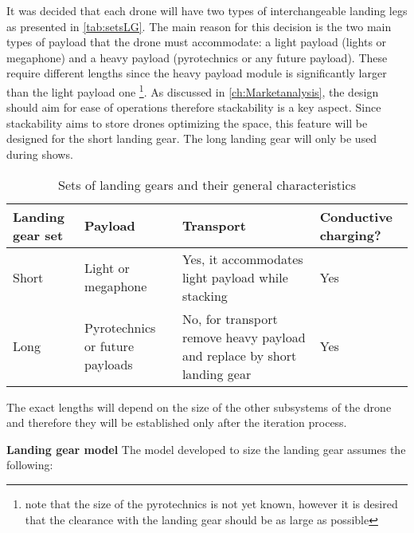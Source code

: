 It was decided that each drone will have two types of interchangeable landing legs as presented in \autoref{tab:setsLG}. The main reason for this decision is the two main types of payload that the drone must accommodate: a light payload (lights or megaphone) and a heavy payload (pyrotechnics or any future payload).  These require different lengths since the heavy payload module is significantly larger than the light payload one \footnote{note that the size of the pyrotechnics is not yet known, however it is desired that the clearance with the landing gear should be as large as possible}. As discussed in \autoref{ch:Marketanalysis}, the design should aim for ease of operations therefore stackability is a key aspect. Since stackability aims to store drones optimizing the space, this feature will be designed for the short landing gear. The long landing gear will only be used during shows.

\begin{table}[h]
\centering
\caption{Sets of landing gears and their general characteristics}
\label{tab:setsLG}
\begin{tabular}{|p{1.5cm}|p{4cm}|p{6.2cm}|p{1.8cm}|}
\hline
\textbf{Landing gear set} & \textbf{Payload} & \textbf{Transport} & \textbf{Conductive charging?} \\ \hline
Short & Light or megaphone & Yes, it accommodates light payload while stacking & Yes \\ \hline
Long & Pyrotechnics or future payloads & No, for transport remove heavy payload and replace by short landing gear & Yes \\ \hline
\end{tabular}%
\end{table}

The exact lengths will depend on the size of the other subsystems of the drone and therefore they will be established only after the iteration process. 

\textbf{Landing gear model} \newline
The model developed to size the landing gear assumes the following:

